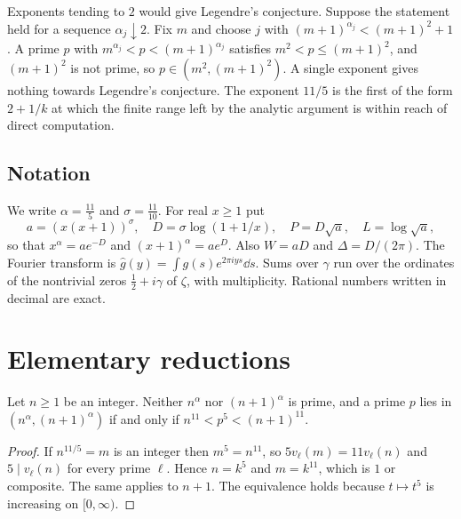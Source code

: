 \documentclass[11pt,colorlinks]{charlie}
\begin{document}
\begin{remark}[Why $11/5$]
Exponents tending to $2$ would give Legendre's conjecture. Suppose the statement held for a sequence $\alpha_j\downarrow2$. Fix $m$ and choose $j$ with $(m+1)^{\alpha_j}<(m+1)^2+1$. A prime $p$ with $m^{\alpha_j}<p<(m+1)^{\alpha_j}$ satisfies $m^2<p\le(m+1)^2$, and $(m+1)^2$ is not prime, so $p\in(m^2,(m+1)^2)$. A single exponent gives nothing towards Legendre's conjecture. The exponent $11/5$ is the first of the form $2+1/k$ at which the finite range left by the analytic argument is within reach of direct computation.
\end{remark}
\subsection*{Notation}
We write $\alpha=\frac{11}5$ and $\sigma=\frac{11}{10}$. For real $x\ge1$ put
\begin{equation}\label{eq:aD}
 a=(x(x+1))^{\sigma},\quad D=\sigma\log(1+1/x),\quad P=D\sqrt a,\quad L=\log\sqrt a,
\end{equation}
so that $x^\alpha=ae^{-D}$ and $(x+1)^\alpha=ae^{D}$. Also $W=aD$ and $\Delta=D/(2\pi)$. The Fourier transform is $\widehat g(y)=\int g(s)e^{2\pi iys}\dd s$. Sums over $\gamma$ run over the ordinates of the nontrivial zeros $\frac12+i\gamma$ of $\zeta$, with multiplicity. Rational numbers written in decimal are exact.

\section{Elementary reductions}\label{sec:elementary}

\begin{lemma}\label{lem:integer}
Let $n\ge1$ be an integer. Neither $n^{\alpha}$ nor $(n+1)^\alpha$ is prime, and a prime $p$ lies in $(n^\alpha,(n+1)^\alpha)$ if and only if $n^{11}<p^5<(n+1)^{11}$.
\end{lemma}
\begin{proof}
If $n^{11/5}=m$ is an integer then $m^5=n^{11}$, so $5v_\ell(m)=11v_\ell(n)$ and $5\mid v_\ell(n)$ for every prime $\ell$. Hence $n=k^5$ and $m=k^{11}$, which is $1$ or composite. The same applies to $n+1$. The equivalence holds because $t\mapsto t^5$ is increasing on $[0,\infty)$.
\end{proof}
\end{document}
